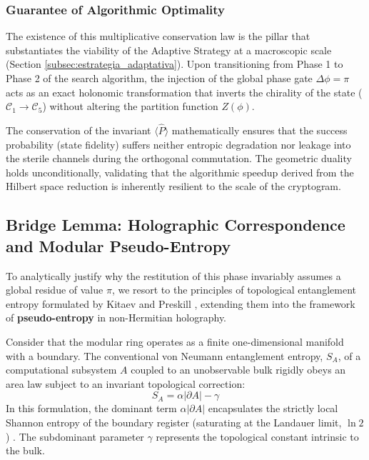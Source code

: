\documentclass[reprint,aps,pra,superscriptaddress,nofootinbib]{revtex4-2}
\theoremstyle{plain}
\theoremstyle{definition}
\theoremstyle{remark}
\begin{document}
\subsubsection*{Guarantee of Algorithmic Optimality}

The existence of this multiplicative conservation law is the pillar that substantiates the viability of the Adaptive Strategy at a macroscopic scale (Section \ref{subsec:estrategia_adaptativa}). Upon transitioning from Phase 1 to Phase 2 of the search algorithm, the injection of the global phase gate $\Delta\phi = \pi$ acts as an exact holonomic transformation that inverts the chirality of the state ($\mathcal{C}_1 \to \mathcal{C}_5$) without altering the partition function $Z(\phi)$. 

The conservation of the invariant $\langle \hat{P} \rangle$ mathematically ensures that the success probability (state fidelity) suffers neither entropic degradation nor leakage into the sterile channels during the orthogonal commutation. The geometric duality holds unconditionally, validating that the algorithmic speedup derived from the Hilbert space reduction is inherently resilient to the scale of the cryptogram.

\subsection{Bridge Lemma: Holographic Correspondence and Modular Pseudo-Entropy}
\label{subsec:lema_puente}

To analytically justify why the restitution of this phase invariably assumes a global residue of value $\pi$, we resort to the principles of topological entanglement entropy formulated by Kitaev and Preskill \cite{Kitaev2006}, extending them into the framework of \textbf{pseudo-entropy} in non-Hermitian holography.

Consider that the modular ring operates as a finite one-dimensional manifold with a boundary. The conventional von Neumann entanglement entropy, $S_A$, of a computational subsystem $A$ coupled to an unobservable bulk rigidly obeys an area law subject to an invariant topological correction:
\begin{equation}
    S_A = \alpha |\partial A| - \gamma
\end{equation}
In this formulation, the dominant term $\alpha |\partial A|$ encapsulates the strictly local Shannon entropy of the boundary register (saturating at the Landauer limit, $\ln 2$) \cite{Landauer1961}. The subdominant parameter $\gamma$ represents the topological constant intrinsic to the bulk.
\end{document}
